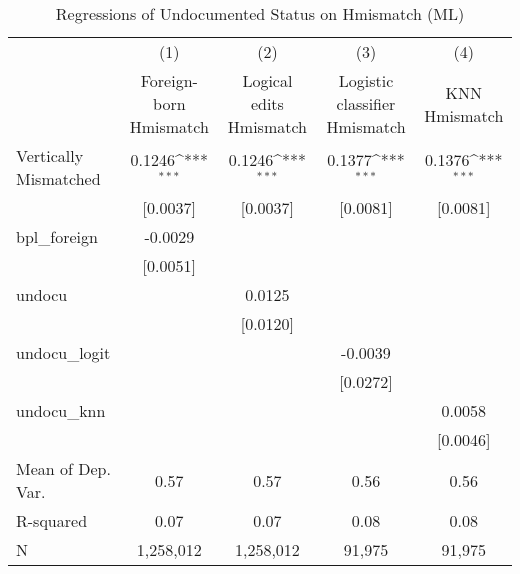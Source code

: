 \begin{table}[htbp]\centering
\def\sym#1{\ifmmode^{#1}\else\(^{#1}\)\fi}
\caption{Regressions of Undocumented Status on Hmismatch (ML)}
\begin{tabular}{l*{4}{c}}
\toprule
                    &\multicolumn{1}{c}{(1)}         &\multicolumn{1}{c}{(2)}         &\multicolumn{1}{c}{(3)}         &\multicolumn{1}{c}{(4)}         \\
                    &Foreign-born Hmismatch         &Logical edits Hmismatch         &Logistic classifier Hmismatch         &KNN Hmismatch         \\
\midrule
Vertically Mismatched&      0.1246\sym{***}&      0.1246\sym{***}&      0.1377\sym{***}&      0.1376\sym{***}\\
                    &    [0.0037]         &    [0.0037]         &    [0.0081]         &    [0.0081]         \\
\addlinespace
bpl\_foreign         &     -0.0029         &                     &                     &                     \\
                    &    [0.0051]         &                     &                     &                     \\
\addlinespace
undocu              &                     &      0.0125         &                     &                     \\
                    &                     &    [0.0120]         &                     &                     \\
\addlinespace
undocu\_logit        &                     &                     &     -0.0039         &                     \\
                    &                     &                     &    [0.0272]         &                     \\
\addlinespace
undocu\_knn          &                     &                     &                     &      0.0058         \\
                    &                     &                     &                     &    [0.0046]         \\
\midrule
Mean of Dep. Var.   &        0.57         &        0.57         &        0.56         &        0.56         \\
R-squared           &        0.07         &        0.07         &        0.08         &        0.08         \\
N                   &   1,258,012         &   1,258,012         &      91,975         &      91,975         \\

\end{tabular}
\end{table}
